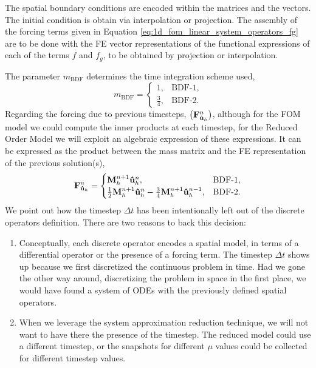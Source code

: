 \documentclass[../../thesis.tex]{subfiles}
\newcommand{\dt}{\ensuremath{\Delta t}}
\begin{document}
The spatial boundary conditions are encoded within the matrices and the vectors. 
The initial condition is obtain via interpolation or projection.
The assembly of the forcing terms given in Equation \eqref{eq:1d_fom_linear_system_operators_fg}
are to be done with the FE vector representations of the functional expressions of each of the terms $f$ and $f_g$, to be obtained by projection or interpolation.

The parameter $m_{\text{BDF}}$ determines the time integration scheme used,
\begin{equation}
    m_{\text{BDF}} = 
    \begin{cases}
    1, &\text{BDF-1},
    \\    
    \frac{3}{4}, &\text{BDF-2}.
    \end{cases}
\end{equation}
Regarding the forcing due to previous timesteps, $\left(\vb{F}_{\vb{\hat{u}}_h}^{n}\right)$, 
although for the FOM model we could compute the inner products at each timestep, 
for the Reduced Order Model we will exploit an algebraic expression of these expressions.
It can be expressed as the product between the mass matrix and the FE representation of the previous solution(s), 
\begin{equation}
    \label{eq:1d_fom_forcing_term_time_mass_matrix}
    \vb{F}_{\vb{\hat{u}}_h}^{n}= 
    \begin{cases}
        \vb{M}_{h}^{n+1} \vb{\hat{u}}_{h}^{n},                &\text{BDF-1},
        \\
        \frac{1}{2}\vb{M}_{h}^{n+1} \vb{\hat{u}}_{h}^{n}
        - \frac{3}{4}\vb{M}_{h}^{n+1} \vb{\hat{u}}_{h}^{n-1}, &\text{BDF-2}.
    \end{cases}
\end{equation}
We point out how the timestep $\dt$ has been intentionally left out of the discrete operators definition.
There are two reasons to back this decision:
\begin{enumerate}
    \item Conceptually, each discrete operator encodes a spatial model, in terms of a differential operator or the presence of a forcing term.
    The timestep $\dt$ shows up because we first discretized the continuous problem in time. 
    Had we gone the other way around, discretizing the problem in space in the first place, we would have found a system of ODEs with the previously defined spatial operators. 
    \item When we leverage the system approximation reduction technique, we will not want to have there the presence of the timestep.
    The reduced model could use a different timestep, or the snapshots for different $\mu$ values could be collected for different timestep values.
\end{enumerate}
\end{document}
